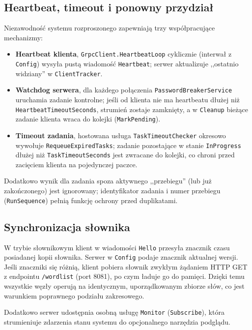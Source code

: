 \documentclass[11pt,a4paper]{article}
\begin{document}
\subsection{Heartbeat, timeout i ponowny przydział}
Niezawodność systemu rozproszonego zapewniają trzy współpracujące mechanizmy:
\begin{itemize}
  \item \textbf{Heartbeat klienta}, \texttt{GrpcClient.HeartbeatLoop} cyklicznie (interwał z
        \texttt{Config}) wysyła pustą wiadomość \texttt{Heartbeat}; serwer aktualizuje
        ,,ostatnio widziany'' w \texttt{ClientTracker}.
  \item \textbf{Watchdog serwera}, dla każdego połączenia \texttt{PasswordBreakerService}
        uruchamia zadanie kontrolne; jeśli od klienta nie ma heartbeatu dłużej niż
        \texttt{HeartbeatTimeoutSeconds}, strumień zostaje zamknięty, a w \texttt{Cleanup}
        bieżące zadanie klienta wraca do kolejki (\texttt{MarkPending}).
  \item \textbf{Timeout zadania}, hostowana usługa \texttt{TaskTimeoutChecker} okresowo
        wywołuje \texttt{RequeueExpiredTasks}; zadanie pozostające w stanie \texttt{InProgress}
        dłużej niż \texttt{TaskTimeoutSeconds} jest zwracane do kolejki, co chroni przed
        zacięciem klienta na pojedynczej paczce.
\end{itemize}
Dodatkowo wynik dla zadania spoza aktywnego ,,przebiegu'' (lub już zakończonego) jest ignorowany;
identyfikator zadania i numer przebiegu (\texttt{RunSequence}) pełnią funkcję ochrony przed
duplikatami.

\subsection{Synchronizacja słownika}
W trybie słownikowym klient w wiadomości \texttt{Hello} przesyła znacznik czasu posiadanej kopii
słownika. Serwer w \texttt{Config} podaje znacznik aktualnej wersji. Jeśli znaczniki się różnią,
klient pobiera słownik zwykłym żądaniem HTTP GET z endpointu \texttt{/wordlist} (port 8081), po
czym ładuje go do pamięci. Dzięki temu wszystkie węzły operują na identycznym, uporządkowanym
zbiorze słów, co jest warunkiem poprawnego podziału zakresowego.

Dodatkowo serwer udostępnia osobną usługę \texttt{Monitor} (\texttt{Subscribe}), która
strumieniuje zdarzenia stanu systemu do opcjonalnego narzędzia podglądu.

\end{document}
